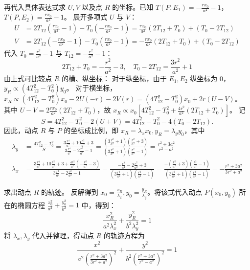 \begin{solution}
再代入具体表达式求 $U,V$ 以及点 $R$ 的坐标。已知 $T(P,E_1) = -\frac{rx_0}{a^2}-1$，$T(P,E_2) = \frac{rx_0}{a^2}-1$。
展开多项式 $U$ 与 $V$：
\begin{align*}
U &= 2T_{12} \left(\frac{rx_0}{a^2}-1\right) - T_0 \left(-\frac{rx_0}{a^2}-1\right) = \frac{rx_0}{a^2}(2T_{12} + T_0) + (T_0 - 2T_{12}) \\
V &= 2T_{12} \left(-\frac{rx_0}{a^2}-1\right) - T_0 \left(\frac{rx_0}{a^2}-1\right) = -\frac{rx_0}{a^2}(2T_{12} + T_0) + (T_0 - 2T_{12})
\end{align*}
代入 $T_0 = \frac{r^2}{a^2}-1$ 与 $T_{12} = -\frac{r^2}{a^2}-1$：
$$ 2T_{12} + T_0 = -\frac{r^2}{a^2} - 3, \quad T_0 - 2T_{12} = \frac{3r^2}{a^2} + 1 $$
由上式可比较点 $R$ 的横、纵坐标：
对于纵坐标，由于 $E_1, E_2$ 纵坐标为 0，$y_R \propto (4T_{12}^2 - T_0^2) y_0$。
对于横坐标，$x_R \propto (4T_{12}^2 - T_0^2) x_0 - 2U(-r) - 2V(r) = (4T_{12}^2 - T_0^2) x_0 + 2r(U-V)$。
其中 $U-V = 2\frac{rx_0}{a^2}(2T_{12} + T_0)$，故 $x_R \propto x_0 \left[ 4T_{12}^2 - T_0^2 + \frac{4r^2}{a^2}(2T_{12} + T_0) \right]$。
记
$$ S = 4T_{12}^2 - T_0^2 - 2(U+V) = 4T_{12}^2 - T_0^2 - 4(T_0 - 2T_{12}). $$
因此，动点 $R$ 与 $P$ 的坐标成比例，即 $x_R = \lambda_x x_0, y_R = \lambda_y y_0$，其中
\begin{align*}
\lambda_y &= \frac{4T_{12}^2 - T_0^2}{S} = \frac{3\frac{r^4}{a^4} + 10\frac{r^2}{a^2} + 3}{3\frac{r^4}{a^4} - 2\frac{r^2}{a^2} - 1} = \frac{\left(3\frac{r^2}{a^2}+1\right)\left(\frac{r^2}{a^2}+3\right)}{\left(3\frac{r^2}{a^2}+1\right)\left(\frac{r^2}{a^2}-1\right)} = \frac{r^2 + 3a^2}{r^2 - a^2} \\
\lambda_x &= \frac{3\frac{r^4}{a^4} + 10\frac{r^2}{a^2} + 3 + \frac{4r^2}{a^2}\left(-\frac{r^2}{a^2}-3\right)}{3\frac{r^4}{a^4} - 2\frac{r^2}{a^2} - 1} = \frac{-\frac{r^4}{a^4} - 2\frac{r^2}{a^2} + 3}{\left(3\frac{r^2}{a^2}+1\right)\left(\frac{r^2}{a^2}-1\right)} = \frac{-\left(\frac{r^2}{a^2}+3\right)\left(\frac{r^2}{a^2}-1\right)}{\left(3\frac{r^2}{a^2}+1\right)\left(\frac{r^2}{a^2}-1\right)} = -\frac{r^2 + 3a^2}{3r^2 + a^2}
\end{align*}

求出动点 $R$ 的轨迹。
反解得到 $x_0 = \frac{x_R}{\lambda_x}, y_0 = \frac{y_R}{\lambda_y}$。将该式代入动点 $P(x_0, y_0)$ 所在的椭圆方程 $\frac{x_0^2}{a^2} + \frac{y_0^2}{b^2} = 1$ 中，得到：
$$ \frac{x_R^2}{a^2 \lambda_x^2} + \frac{y_R^2}{b^2 \lambda_y^2} = 1 $$
将 $\lambda_x, \lambda_y$ 代入并整理，得动点 $R$ 的轨迹方程为
$$ \frac{x^2}{a^2 \left( \frac{r^2 + 3a^2}{3r^2 + a^2} \right)^2} + \frac{y^2}{b^2 \left( \frac{r^2 + 3a^2}{r^2 - a^2} \right)^2} = 1 $$
\end{solution}

